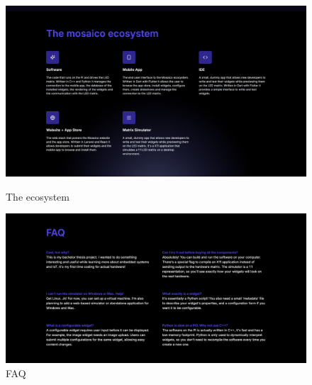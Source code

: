 \begin{figure}[H]
\centering
\begin{minipage}[b]{0.49\textwidth}
\centering
\includegraphics[width=\textwidth]{tesi/img/website_demo/landing/5.png}
\caption*{The ecosystem}
\end{minipage}
\begin{minipage}[b]{0.49\textwidth}
\centering
\includegraphics[width=\textwidth]{tesi/img/website_demo/landing/6.png}
\caption*{FAQ}
\end{minipage}
\end{figure}
